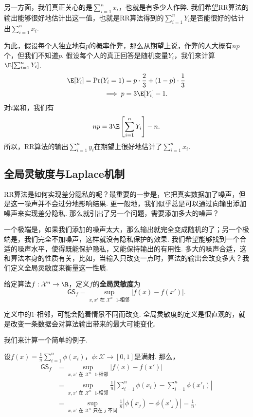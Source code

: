 另一方面，我们真正关心的是$\sum_{i=1}^n x_i$，也就是有多少人作弊. 我们希望RR算法的输出能够很好地估计出这一值，也就是RR算法得到的$\sum_{i=1}^n Y_i$是否能很好的估计出$\sum_{i=1}^n x_i$. 

为此，假设每个人独立地有$p$的概率作弊，那么从期望上说，作弊的人大概有$np$个，但我们不知道$p$. 假设每个人的真正回答是随机变量$Y_i$，我们来计算$\E[\sum_{i=1}^n Y_i]$.
\begin{align*}
    \E[Y_i]=\Pr(Y_i = 1) &= p \cdot \frac23 + (1 - p) \cdot \frac13 \\
    \implies p &= 3\E[Y_i] - 1.
\end{align*}
对$i$累和，我们有
\[
    np=3\E\left[\sum_{i=1}^n Y_i\right] - n.
\]
所以，RR算法的输出$\sum_{i=1}^n y_i$在期望上很好地估计了$\sum_{i=1}^n x_i$.

\subsection{全局灵敏度与Laplace机制}

RR算法是如何实现差分隐私的呢？最重要的一步是，它把真实数据加了噪声，但是这一噪声并不会过分地影响结果. 更一般地，我们似乎总是可以通过向输出添加噪声来实现差分隐私. 那么就引出了另一个问题，需要添加多大的噪声？

一个极端是，如果我们添加的噪声太大，那么输出就完全变成随机的了；另一个极端是，我们完全不加噪声，这样就没有隐私保护的效果. 我们希望能够找到一个合适的噪声水平，使得既能保护隐私，又能保持输出的有用性. 多大的噪声合适，这和算法本身的性质有关，比如，当输入只改变一点时，算法的输出会改变多大？我们定义全局灵敏度来衡量这一性质.

\begin{definition}[全局灵敏度]
给定算法$f: \mathcal X^n \to \R$，定义$f$的\textbf{全局灵敏度}为
    \[
    \mathsf{GS}_f = \sup_{x, x' \text{ 在 }\mathcal X^n\text{ $1$-相邻}} |f(x) - f(x')|. 
    \]
\end{definition}
定义中的$1$-相邻，可能会随着情景不同而改变. 全局灵敏度的定义是很直观的，就是改变一条数据会对算法输出带来的最大可能变化. 

我们来计算一个简单的例子.
\begin{example}
设$f(x)= \frac1n \sum_{i=1}^n \phi(x_i)$，$\phi : \mathcal X\to [0,1]$是满射. 那么，
\begin{align*}
    \mathsf{GS}_f&=\sup_{x, x' \text{ 在 }\mathcal X^n\text{ $1$-相邻}} |f(x) - f(x')|\\
    &= \sup_{x, x' \text{ 在 }\mathcal X^n\text{ $1$-相邻}} \frac1n \left|\sum_{i=1}^n \phi(x_i) - \sum_{i=1}^n \phi(x'_i)\right|\\
    &= \sup_{x, x' \text{ 在 }\mathcal X^n\text{ 只在 } j\text{ 不同}} \frac1n \left|\phi(x_j) - \phi(x'_j)\right| = \frac1n.
\end{align*}
\end{example}

